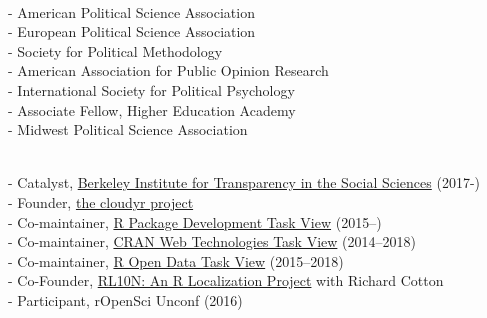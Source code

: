 \documentclass[12pt]{article}
\renewcommand{\section}[1]{\pagebreak[3]%
    \llap{\scshape\smash{\parbox[t]{\marginparwidth}{\raggedright {\color{lg}#1}}}}%
    \vspace{-\baselineskip}\par}
\newcommand{\topic}[1]{\pagebreak[3]\indent {\color{lg}{\footnotesize #1 }}\\}
\newcommand{\subentry}[1]{{\color{lg}-} #1\vspace{.25em}\\}
\begin{document}
\topic{Current and Former Professional Memberships}
		\subentry{American Political Science Association}
		\subentry{European Political Science Association}
        \subentry{Society for Political Methodology}
		\subentry{American Association for Public Opinion Research}
		\subentry{International Society for Political Psychology}
		\subentry{Associate Fellow, Higher Education Academy}
        \subentry{Midwest Political Science Association}
		
\section{Public\\ Engagement}
	\topic{Open Science Evangelism}
		\subentry{Catalyst, \href{http://www.bitss.org/}{Berkeley Institute for Transparency in the Social Sciences} (2017-)}
		\subentry{Founder, \href{http://cloudyr.github.io/}{the cloudyr project}}
		\subentry{Co-maintainer, \href{https://www.github.com/leeper/PackageDevelopment}{R Package Development Task View} (2015--)}
		\subentry{Co-maintainer, \href{http://cran.r-project.org/web/views/WebTechnologies.html}{CRAN Web Technologies Task View} (2014--2018)}
		\subentry{Co-maintainer, \href{https://www.github.com/ropensci/opendata}{R Open Data Task View} (2015--2018)}
		\subentry{Co-Founder, \href{http://rl10n.github.io/}{RL10N: An R Localization Project} with Richard Cotton}
		\subentry{Participant, rOpenSci Unconf (2016)}
	
\end{document}
